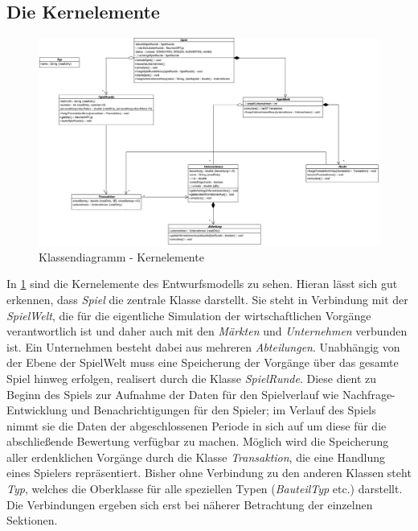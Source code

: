 \subsection{Die Kernelemente}
\begin{figure}[htb]
     \centering
     \includegraphics[width=\textwidth]{30_Fachkonzept/20_Entwurf/kern}
     \caption{Klassendiagramm - Kernelemente}
     \label{img:fachkonzept-entwurf-kern}
\end{figure}

In \ref{img:fachkonzept-entwurf-kern} sind die Kernelemente des Entwurfsmodells zu sehen. Hieran lässt sich gut erkennen, dass \textit{Spiel} die zentrale Klasse darstellt. Sie steht in Verbindung mit der \textit{SpielWelt}, die für die eigentliche Simulation der wirtschaftlichen Vorgänge verantwortlich ist und daher auch mit den \textit{Märkten} und \textit{Unternehmen} verbunden ist. Ein Unternehmen besteht dabei aus mehreren \textit{Abteilungen}. Unabhängig von der Ebene der SpielWelt muss eine Speicherung der Vorgänge über das gesamte Spiel hinweg erfolgen, realisert durch die Klasse \textit{SpielRunde}. Diese dient zu Beginn des Spiels zur Aufnahme der Daten für den Spielverlauf wie Nachfrage-Entwicklung und Benachrichtigungen für den Spieler; im Verlauf des Spiels nimmt sie die Daten der abgeschlossenen Periode in sich auf um diese für die abschließende Bewertung verfügbar zu machen. Möglich wird die Speicherung aller erdenklichen Vorgänge durch die Klasse \textit{Transaktion}, die eine Handlung eines Spielers repräsentiert. Bisher ohne Verbindung zu den anderen Klassen steht \textit{Typ}, welches die Oberklasse für alle speziellen Typen (\textit{BauteilTyp} etc.) darstellt. Die Verbindungen ergeben sich erst bei näherer Betrachtung der einzelnen Sektionen.

